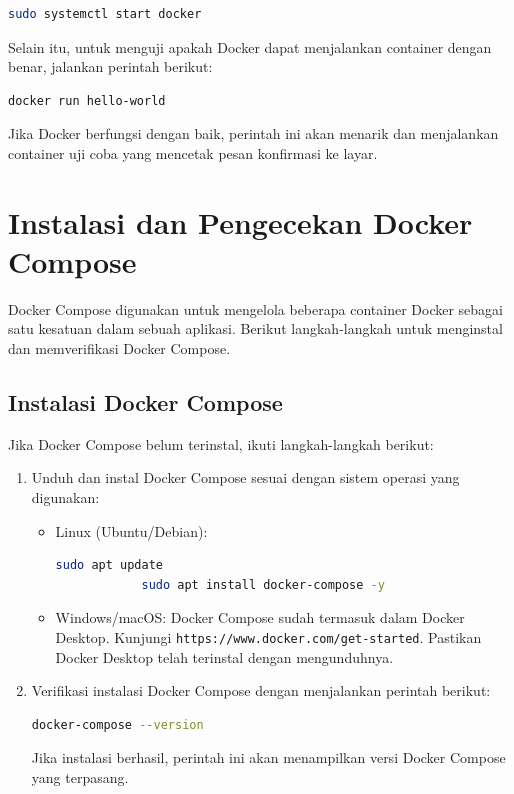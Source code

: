 \begin{lstlisting}[language=bash]
sudo systemctl start docker
\end{lstlisting}

Selain itu, untuk menguji apakah Docker dapat menjalankan container dengan benar, jalankan perintah berikut:

\begin{lstlisting}[language=bash]
docker run hello-world
\end{lstlisting}

Jika Docker berfungsi dengan baik, perintah ini akan menarik dan menjalankan container uji coba yang mencetak pesan konfirmasi ke layar.

\section{Instalasi dan Pengecekan Docker Compose}

Docker Compose digunakan untuk mengelola beberapa container Docker sebagai satu kesatuan dalam sebuah aplikasi. Berikut langkah-langkah untuk menginstal dan memverifikasi Docker Compose.

\subsection{Instalasi Docker Compose}

Jika Docker Compose belum terinstal, ikuti langkah-langkah berikut:

\begin{enumerate}
	\item Unduh dan instal Docker Compose sesuai dengan sistem operasi yang digunakan:
	\begin{itemize}
		\item Linux (Ubuntu/Debian):
		\begin{lstlisting}[language=bash]
			sudo apt update
			sudo apt install docker-compose -y
		\end{lstlisting}
		
		\item Windows/macOS: Docker Compose sudah termasuk dalam Docker Desktop. Kunjungi \texttt{https://www.docker.com/get-started}. Pastikan Docker Desktop telah terinstal dengan mengunduhnya.
	\end{itemize}
	
	\item Verifikasi instalasi Docker Compose dengan menjalankan perintah berikut:
	\begin{lstlisting}[language=bash]
		docker-compose --version
	\end{lstlisting}
	Jika instalasi berhasil, perintah ini akan menampilkan versi Docker Compose yang terpasang.
\end{enumerate}


